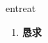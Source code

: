 
\begin{frame}
{\huge entreat}
\begin{center}
\begin{enumerate}\Large
  \item \textbf{恳求}
\end{enumerate}
\end{center}
\end{frame}
